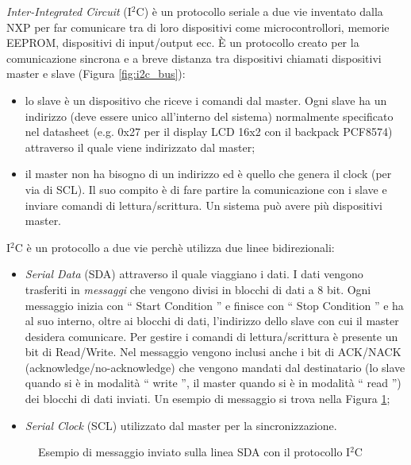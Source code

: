 \documentclass[12pt]{report}
\begin{document}
\emph{Inter-Integrated Circuit} (I$^2$C) è un protocollo seriale a due vie inventato dalla NXP per far comunicare tra di loro dispositivi come microcontrollori, memorie EEPROM, dispositivi di input/output ecc. È un protocollo creato per la comunicazione sincrona e a breve distanza tra dispositivi chiamati dispositivi master e slave (Figura \ref{fig:i2c_bus}): 

\begin{itemize}
	\item lo slave è un dispositivo che riceve i comandi dal master. Ogni slave ha un indirizzo (deve essere unico all'interno del sistema) normalmente specificato nel datasheet (e.g$.$ 0x27 per il display LCD 16x2 con il backpack PCF8574) attraverso il quale viene indirizzato dal master;
	\item il master non ha bisogno di un indirizzo ed è quello che genera il clock (per via di SCL). Il suo compito è di fare partire la comunicazione con i slave e inviare comandi di lettura/scrittura. Un sistema può avere più dispositivi master.
\end{itemize}
I$^2$C è un protocollo a due vie perchè utilizza due linee bidirezionali:

\begin{itemize}
	\item \emph{Serial Data} (SDA) attraverso il quale viaggiano i dati. I dati vengono trasferiti in \textit{messaggi} che vengono divisi in blocchi di dati a 8 bit. Ogni messaggio inizia con  \textquotedblleft{} Start Condition \textquotedblright{} e finisce con \textquotedblleft{} Stop Condition \textquotedblright{} e ha al suo interno, oltre ai blocchi di dati, l'indirizzo dello slave con cui il master desidera comunicare. Per gestire i comandi di lettura/scrittura è presente un bit di Read/Write. Nel messaggio vengono inclusi anche i bit di ACK/NACK (acknowledge/no-acknowledge) che vengono mandati dal destinatario (lo slave quando si è in modalità \textquotedblleft{} write \textquotedblright{}, il master quando si è in modalità \textquotedblleft{} read \textquotedblright{}) dei blocchi di dati inviati. Un esempio di messaggio si trova nella Figura \ref{fig:i2c_data_bus};
	\item \emph{Serial Clock} (SCL) utilizzato dal master per la sincronizzazione.
\end{itemize}

\begin{figure}[H]
	\caption{Esempio di messaggio inviato sulla linea SDA con il protocollo I$^2$C }
	\label{fig:i2c_data_bus}
\end{figure}
\end{document}
